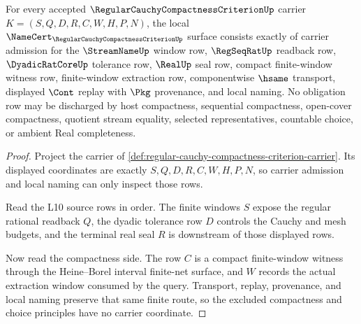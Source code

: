\begin{theorem}
\label{thm:regular-cauchy-compactness-criterion-namecert-obligations}
For every accepted $\RegularCauchyCompactnessCriterionUp$ carrier $K=(S,Q,D,R,C,W,H,P,N)$, the local $\NameCert_{\RegularCauchyCompactnessCriterionUp}$ surface consists exactly of carrier admission for the $\StreamNameUp$ window row, $\RegSeqRatUp$ readback row, $\DyadicRatCoreUp$ tolerance row, $\RealUp$ seal row, compact finite-window witness row, finite-window extraction row, componentwise $\hsame$ transport, displayed $\Cont$ replay with $\Pkg$ provenance, and local naming. No obligation row may be discharged by host compactness, sequential compactness, open-cover compactness, quotient stream equality, selected representatives, countable choice, or ambient Real completeness.
\end{theorem}
\begin{proof}
Project the carrier of \autoref{def:regular-cauchy-compactness-criterion-carrier}. Its displayed coordinates are exactly $S,Q,D,R,C,W,H,P,N$, so carrier admission and local naming can only inspect those rows.

Read the L10 source rows in order. The finite windows $S$ expose the regular rational readback $Q$, the dyadic tolerance row $D$ controls the Cauchy and mesh budgets, and the terminal real seal $R$ is downstream of those displayed rows.

Now read the compactness side. The row $C$ is a compact finite-window witness through the Heine--Borel interval finite-net surface, and $W$ records the actual extraction window consumed by the query. Transport, replay, provenance, and local naming preserve that same finite route, so the excluded compactness and choice principles have no carrier coordinate.
\end{proof}

